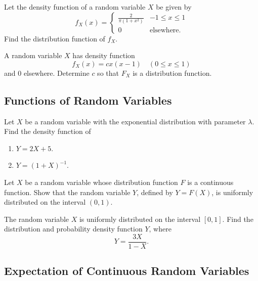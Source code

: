 \begin{problem}\label{Prob:FindDistroFunction}
Let the density function of a random variable $X$ be given by
    \[
        f_X (x) = \left\{ \begin{matrix} \displaystyle \frac{2}{\pi (1 + x^2 )} & -1 \leq x \leq 1 \\
        0 & \text{elsewhere.} \end{matrix} \right. 
    \]
Find the distribution function of $f_X$. 
\end{problem}

\begin{problem}\label{Prob:FindDistroFunction2}
A random variable $X$ has density function
    \[
        f_X (x) = c x (x - 1) \quad (0 \leq x \leq 1 ) 
    \]
and $0$ elsewhere. Determine $c$ so that $F_X$ is a distribution function.
\end{problem}

\subsection{Functions of Random Variables}

\begin{problem}
Let $X$ be a random variable with the exponential distribution with parameter $\lambda$. Find the density function of
    \begin{enumerate}[label=\alph*)]
        \item $Y = 2X + 5$.
        \item $Y = (1 + X)^{-1}$.
    \end{enumerate}
\end{problem}

\begin{problem}
Let $X$ be a random variable whose distribution function $F$ is a continuous function. Show that the random variable $Y$, defined by $Y = F(X)$, is uniformly distributed on the interval $(0, 1)$.
\end{problem}

\begin{problem}
The random variable $X$ is uniformly distributed on the interval $[0, 1]$. Find the distribution and probability density function $Y$, where
    \[
        Y = \frac{3X}{1 - X} .
    \]
\end{problem}

\subsection{Expectation of Continuous Random Variables}

